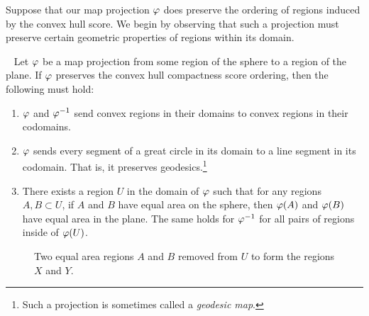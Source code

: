 Suppose that our map projection $\varphi$ does  preserve the ordering of regions induced by the convex hull score.  We begin by observing that such a projection must preserve certain geometric properties of regions within its domain.
\begin{lemma}~\label{lem:CH_prep}
	Let $\varphi$ be a map projection from some region of the sphere to a region of the plane. If $\varphi$ preserves the convex hull compactness score ordering, then the following must 
	hold:
	\begin{enumerate}
		\item $\varphi$ and $\varphi^{-1}$ send convex regions in their domains to convex regions in their codomains.
		\item $\varphi$ sends every segment of a great circle in its domain to a line segment in its codomain.  That is, it preserves geodesics.\footnote{Such a projection is sometimes called a \textit{geodesic map}.}
		\item There exists a region $U$ in the domain of $\varphi$
		such that for any regions $A,B\subset U$, if 
		$A$ and $B$ have equal area on the sphere, then 
		$\varphi(A)$ and $\varphi(B)$ have equal area in the plane.  The same holds 
		for $\varphi^{-1}$ for all pairs of regions inside of $\varphi(U)$.
	\end{enumerate}
\end{lemma}



\begin{figure}[h]
	\centering
	\begin{minipage}{.3\textwidth}
			\centering
	
			\end{minipage}
	\begin{minipage}{.3\textwidth}
			\centering
	
\end{minipage}
	\begin{minipage}{.3\textwidth}
			\centering
	
\end{minipage}
	\caption{Two equal area regions $A$ and $B$ removed from $U$ to form the regions $X$ and $Y$.}
	\label{fig:ch_schema}
\end{figure}



